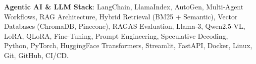 \item \textbf{Agentic AI \& LLM Stack}: LangChain, LlamaIndex, AutoGen, Multi-Agent Workflows, RAG Architecture, Hybrid Retrieval (BM25 + Semantic), Vector Databases (ChromaDB, Pinecone), RAGAS Evaluation, Llama-3, Qwen2.5-VL, LoRA, QLoRA, Fine-Tuning, Prompt Engineering, Speculative Decoding, Python, PyTorch, HuggingFace Transformers, Streamlit, FastAPI, Docker, Linux, Git, GitHub, CI/CD.


